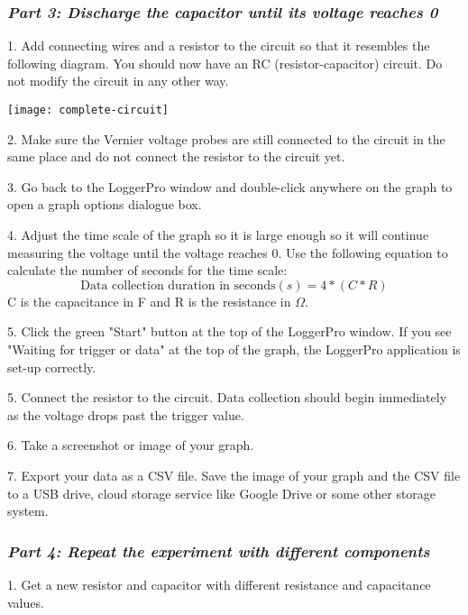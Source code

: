 \documentclass[12pt]{article}
\begin{document}
\pagebreak
\subsubsection*{\emph{Part 3: Discharge the capacitor until its voltage reaches 0}}

1. Add connecting wires and a resistor to the circuit so that it resembles the following diagram. You should now have an RC (resistor-capacitor) circuit. Do not modify the circuit in any other way. 

\begin{center} \texttt{[image: complete-circuit]} \\ \footnotesize \end{center}

2. Make sure the Vernier voltage probes are still connected to the circuit in the same place and do not connect the resistor to the circuit yet.

3. Go back to the LoggerPro window and double-click anywhere on the graph to open a graph options dialogue box.

4. Adjust the time scale of the graph so it is large enough so it will continue measuring the voltage until the voltage reaches 0.
Use the following equation to calculate the number of seconds for the time scale:
$$ \text{Data collection duration in seconds} (s) = 4 * (C * R) $$
C is the capacitance in F and R is the resistance in $\Omega$.

5. Click the green "Start" button at the top of the LoggerPro window. If you see "Waiting for trigger or data" at the top of the graph, the LoggerPro application is set-up correctly.

5. Connect the resistor to the circuit. Data collection should begin immediately as the voltage drops past the trigger value.
 
6. Take a screenshot or image of your graph.

7. Export your data as a CSV file. Save the image of your graph and the CSV file to a USB drive, cloud storage service like Google Drive or some other storage system.
\pagebreak
\subsubsection*{\emph{Part 4: Repeat the experiment with different components}}
1. Get a new resistor and capacitor with different resistance and capacitance values.
\end{document}
